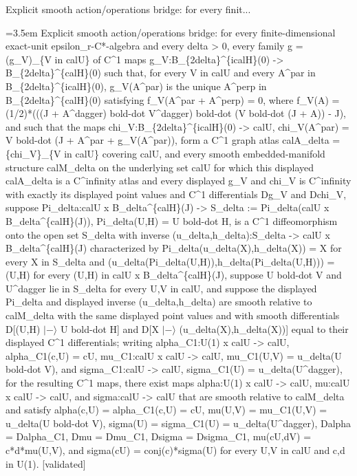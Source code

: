 \documentclass{article}
\newcommand{\step}[1]{\par\noindent\hangindent=3.5em\hangafter=1%
  \makebox[3.5em][l]{\textbf{#1.}}}
\newcommand{\steptag}[1]{\hfill{\small\textsf{[#1]}}}
\begin{document}
\begin{proofbox}{Explicit smooth action/operations bridge: for every finit...}
\step{1} Explicit smooth action/operations bridge: for every finite-dimensional exact-unit epsilon\_r-C*-algebra and every delta > 0, every family g = (g\_V)\_\{V in calU\} of C\textasciicircum{}1 maps g\_V:B\_\{2delta\}\textasciicircum{}\{icalH\}(0) -> B\_\{2delta\}\textasciicircum{}\{calH\}(0) such that, for every V in calU and every A\textasciicircum{}par in B\_\{2delta\}\textasciicircum{}\{icalH\}(0), g\_V(A\textasciicircum{}par) is the unique A\textasciicircum{}perp in B\_\{2delta\}\textasciicircum{}\{calH\}(0) satisfying f\_V(A\textasciicircum{}par + A\textasciicircum{}perp) = 0, where f\_V(A) = (1/2)*(((J + A\textasciicircum{}dagger) bold-dot V\textasciicircum{}dagger) bold-dot (V bold-dot (J + A)) - J), and such that the maps chi\_V:B\_\{2delta\}\textasciicircum{}\{icalH\}(0) -> calU, chi\_V(A\textasciicircum{}par) = V bold-dot (J + A\textasciicircum{}par + g\_V(A\textasciicircum{}par)), form a C\textasciicircum{}1 graph atlas calA\_delta = \{chi\_V\}\_\{V in calU\} covering calU, and every smooth embedded-manifold structure calM\_delta on the underlying set calU for which this displayed calA\_delta is a C\textasciicircum{}infinity atlas and every displayed g\_V and chi\_V is C\textasciicircum{}infinity with exactly its displayed point values and C\textasciicircum{}1 differentials Dg\_V and Dchi\_V, suppose Pi\_delta:calU x B\_delta\textasciicircum{}\{calH\}(J) -> S\_delta := Pi\_delta(calU x B\_delta\textasciicircum{}\{calH\}(J)), Pi\_delta(U,H) = U bold-dot H, is a C\textasciicircum{}1 diffeomorphism onto the open set S\_delta with inverse (u\_delta,h\_delta):S\_delta -> calU x B\_delta\textasciicircum{}\{calH\}(J) characterized by Pi\_delta(u\_delta(X),h\_delta(X)) = X for every X in S\_delta and (u\_delta(Pi\_delta(U,H)),h\_delta(Pi\_delta(U,H))) = (U,H) for every (U,H) in calU x B\_delta\textasciicircum{}\{calH\}(J), suppose U bold-dot V and U\textasciicircum{}dagger lie in S\_delta for every U,V in calU, and suppose the displayed Pi\_delta and displayed inverse (u\_delta,h\_delta) are smooth relative to calM\_delta with the same displayed point values and with smooth differentials D[(U,H) $|-\rangle$ U bold-dot H] and D[X $|-\rangle$ (u\_delta(X),h\_delta(X))] equal to their displayed C\textasciicircum{}1 differentials; writing alpha\_C1:U(1) x calU -> calU, alpha\_C1(c,U) = cU, mu\_C1:calU x calU -> calU, mu\_C1(U,V) = u\_delta(U bold-dot V), and sigma\_C1:calU -> calU, sigma\_C1(U) = u\_delta(U\textasciicircum{}dagger), for the resulting C\textasciicircum{}1 maps, there exist maps alpha:U(1) x calU -> calU, mu:calU x calU -> calU, and sigma:calU -> calU that are smooth relative to calM\_delta and satisfy alpha(c,U) = alpha\_C1(c,U) = cU, mu(U,V) = mu\_C1(U,V) = u\_delta(U bold-dot V), sigma(U) = sigma\_C1(U) = u\_delta(U\textasciicircum{}dagger), Dalpha = Dalpha\_C1, Dmu = Dmu\_C1, Dsigma = Dsigma\_C1, mu(cU,dV) = c*d*mu(U,V), and sigma(cU) = conj(c)*sigma(U) for every U,V in calU and c,d in U(1). \steptag{validated} \\[6pt]

\end{proofbox}
\end{document}
